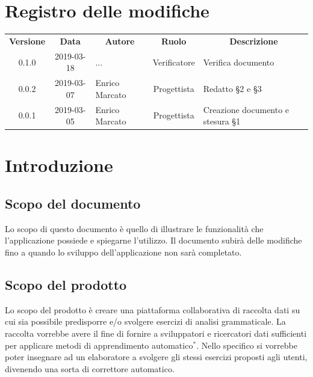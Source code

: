 \documentclass[11pt,a4paper]{article}
\begin{document}
	
	
	{\def\arraystretch{2}\tabcolsep=10pt
	\newpage
	\section*{\centering Registro delle modifiche}
	\begin{tabularx}{\textwidth}{ c | c | p{3.80cm} | c | X }
		\rowcolor{LightBlue}
		\color{white}\bfseries Versione & \color{white}\bfseries Data & \multicolumn{1}{c}{\color{white}\bfseries Autore}
		& \color{white}\bfseries Ruolo & \multicolumn{1}{c}{\color{white}\bfseries Descrizione}\\[0.25cm]
		0.1.0 & 2019-03-18 & ... & Verificatore & Verifica documento \\ \hline
		0.0.2 & 2019-03-07 & Enrico Marcato & Progettista & Redatto \S2 e \S3 \\ \hline
		0.0.1 & 2019-03-05 & Enrico Marcato & Progettista & Creazione documento e stesura \S1 \\ 
	 \hline		
	\end{tabularx}
	
	\newpage	
	
	\renewcommand  \contentsname {\Large Indice} 
	
	\tableofcontents
	\newpage
	\listoffigures
	\lstlistoflistings
	\newpage
	
	\section{Introduzione}
	\subsection{Scopo del documento}
	Lo scopo di questo documento è quello di illustrare le funzionalità che l'applicazione possiede e spiegarne l'utilizzo. Il documento subirà delle modifiche fino a quando lo sviluppo dell'applicazione non sarà completato.
	\subsection{Scopo del prodotto}
	Lo scopo del prodotto è creare una piattaforma collaborativa di raccolta dati su cui sia possibile predisporre e/o svolgere esercizi di analisi grammaticale. La raccolta vorrebbe avere il fine di fornire a sviluppatori e ricercatori dati sufficienti per applicare metodi di apprendimento automatico$^*$. Nello specifico si vorrebbe poter insegnare ad un elaboratore a svolgere gli stessi esercizi proposti agli utenti, divenendo una sorta di correttore automatico.
	
}
\end{document}
